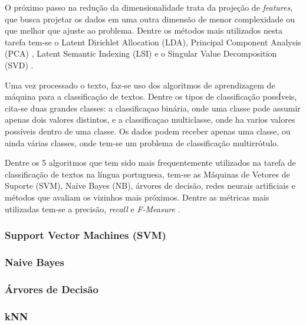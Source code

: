 

O próximo passo na redução da dimensionalidade trata da projeção de \textit{features}, que busca projetar os dados em uma outra dimensão de menor complexidade ou que melhor que ajuste ao problema. Dentre os métodos mais utilizados nesta tarefa tem-se o Latent Dirichlet Allocation (LDA), Principal Component Analysis (PCA) , Latent Semantic Indexing (LSI)  e o Singular Value Decomposition (SVD) . 

Uma vez processado o texto, faz-se uso dos algoritmos de aprendizagem de máquina para a classificação de textos. Dentre os tipos de classificação possÍveis, cita-se duas grandes classes: a classificaçao binária, onde uma classe pode assumir apenas dois valores distintos, e a classificaçao multiclasse, onde ha varios valores possíveis dentro de uma classe. Os dados podem receber apenas uma classe, ou ainda várias classes, onde tem-se um problema de classificação multirrótulo. 

Dentre os 5 algoritmos que tem sido mais frequentemente utilizados na tarefa de classificação de textos na língua portuguesa, tem-se as Máquinas de Vetores de Suporte (SVM), Naïve Bayes (NB), árvores de decisão, redes neurais artificiais e métodos que avaliam os vizinhos mais próximos. Dentre as métricas mais  utilizadas tem-se a precisão, \textit{recall} e \textit{F-Measure} \cite{reviewportugues}.

\subsubsection{Support Vector Machines (SVM)}
\subsubsection{Naive Bayes}
\subsubsection{Árvores de Decisão}
\subsubsection{kNN}


